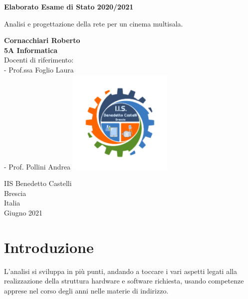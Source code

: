 \documentclass{article}
\newcommand\blankpage{%
    \null
    \thispagestyle{empty}%
    \addtocounter{page}{-1}%
    \newpage}
\begin{document}

\afterpage{\blankpage}

\begin{titlepage}
   \begin{center}
   {\Large 
   \vspace*{1cm}

       \textbf{Elaborato Esame di Stato 2020/2021}

       \vspace{0.5cm}
        Analisi e progettazione della rete per un cinema multisala.
            
       \vspace{1.5cm}

       \textbf{Cornacchiari Roberto}\\
       \textbf{5A Informatica}\\
       \vspace{1cm}
        Docenti di riferimento:\\
        - Prof.ssa Foglio Laura\\
        - Prof. Pollini Andrea
       \vfill
       \vspace{0.8cm}
        \includegraphics[width=5cm]{Logo.png}
        
       IIS Benedetto Castelli\\
       Brescia\\
       Italia\\
       Giugno 2021\\
       }
   \end{center}
\end{titlepage}

\afterpage{\blankpage}

\tableofcontents
\pagebreak

\section{Introduzione}
L'analisi si sviluppa in più punti, andando a toccare i vari aspetti legati alla realizzazione della struttura hardware e software richiesta, usando competenze apprese nel corso degli anni nelle materie di indirizzo.
\end{document}
